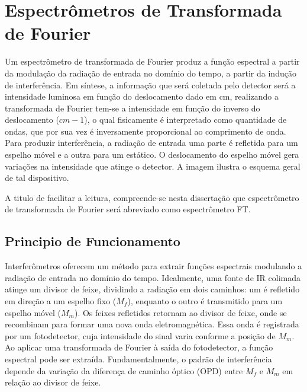 \documentclass[oneside,openright,12pt]{ufsm_2021} %
\begin{document}
    \section{Espectrômetros de Transformada de Fourier}
    \par Um espectrômetro de transformada de Fourier produz a função espectral a partir da modulação da radiação de entrada no domínio do tempo, a partir da indução de interferência. Em síntese, a informação que será coletada pelo detector será a intensidade luminosa em função do deslocamento dado em cm, realizando a transformada de Fourier tem-se a intensidade em função do inverso do deslocamento ($cm-1$), o qual fisicamente é interpretado como quantidade de ondas, que por sua vez é inversamente proporcional ao comprimento de onda. Para produzir interferência, a radiação de entrada uma parte é refletida para um espelho móvel e a outra para um estático. O deslocamento do espelho móvel gera variações na intensidade que atinge o detector. A imagem \cite{Figura3} ilustra o esquema geral de tal dispositivo.

    \par A titulo de facilitar a leitura, compreende-se nesta dissertação que espectrômetro de transformada de Fourier será abreviado como espectrômetro FT.

    \subsection{Principio de Funcionamento}
    \label{sub:PrincFuncionamento}
    \par Interferômetros oferecem um método para extrair funções espectrais modulando a radiação de entrada no domínio do tempo. Idealmente, uma fonte de IR colimada atinge um divisor de feixe, dividindo a radiação em dois caminhos: um é refletido em direção a um espelho fixo ($M_f$), enquanto o outro é transmitido para um espelho móvel ($M_m$). Os feixes refletidos retornam ao divisor de feixe, onde se recombinam para formar uma nova onda eletromagnética. Essa onda é registrada por um fotodetector, cuja intensidade do sinal varia conforme a posição de $M_m$. Ao aplicar uma transformada de Fourier à saída do fotodetector, a função espectral pode ser extraída. Fundamentalmente, o padrão de interferência depende da variação da diferença de caminho óptico (OPD) entre $M_f$ e $M_m$ em relação ao divisor de feixe.
\end{document}
